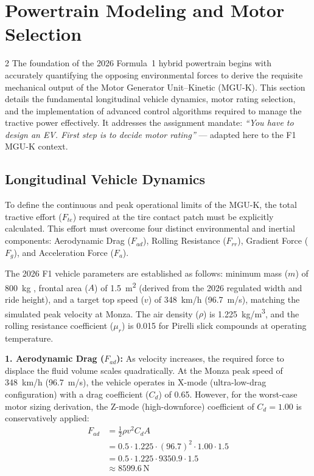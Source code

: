 \section{Powertrain Modeling and Motor Selection}

\begin{multicols}{2}
The foundation of the 2026 Formula~1 hybrid powertrain begins with accurately quantifying the opposing environmental forces to derive the requisite mechanical output of the Motor Generator Unit--Kinetic (MGU-K). This section details the fundamental longitudinal vehicle dynamics, motor rating selection, and the implementation of advanced control algorithms required to manage the tractive power effectively. It addresses the assignment mandate: \textit{``You have to design an EV. First step is to decide motor rating''} --- adapted here to the F1 MGU-K context.

\subsection{Longitudinal Vehicle Dynamics}

To define the continuous and peak operational limits of the MGU-K, the total tractive effort ($F_{te}$) required at the tire contact patch must be explicitly calculated. This effort must overcome four distinct environmental and inertial components: Aerodynamic Drag ($F_{ad}$), Rolling Resistance ($F_{rr}$), Gradient Force ($F_{g}$), and Acceleration Force ($F_{a}$).

The 2026 F1 vehicle parameters are established as follows: minimum mass ($m$) of \SI{800}{kg} \cite{FIA_2026_Chassis_Regulations}, frontal area ($A$) of \SI{1.5}{m^2} (derived from the 2026 regulated width and ride height), and a target top speed ($v$) of \SI{348}{km/h} (\SI{96.7}{m/s}), matching the simulated peak velocity at Monza. The air density ($\rho$) is \SI{1.225}{kg/m^3}, and the rolling resistance coefficient ($\mu_r$) is 0.015 for Pirelli slick compounds at operating temperature.

\textbf{1. Aerodynamic Drag ($F_{ad}$):} As velocity increases, the required force to displace the fluid volume scales quadratically. At the Monza peak speed of \SI{348}{km/h} (\SI{96.7}{m/s}), the vehicle operates in X-mode (ultra-low-drag configuration) with a drag coefficient ($C_d$) of 0.65. However, for the worst-case motor sizing derivation, the Z-mode (high-downforce) coefficient of $C_d = 1.00$ is conservatively applied:
\begin{equation} \label{eq:aero_drag}
\begin{split}
F_{ad} &= \frac{1}{2} \rho v^2 C_d A \\
&= 0.5 \cdot 1.225 \cdot (96.7)^2 \cdot 1.00 \cdot 1.5 \\
&= 0.5 \cdot 1.225 \cdot 9350.9 \cdot 1.5 \\
&\approx 8599.6\,\mathrm{N}
\end{split}
\end{equation}


\end{multicols}
